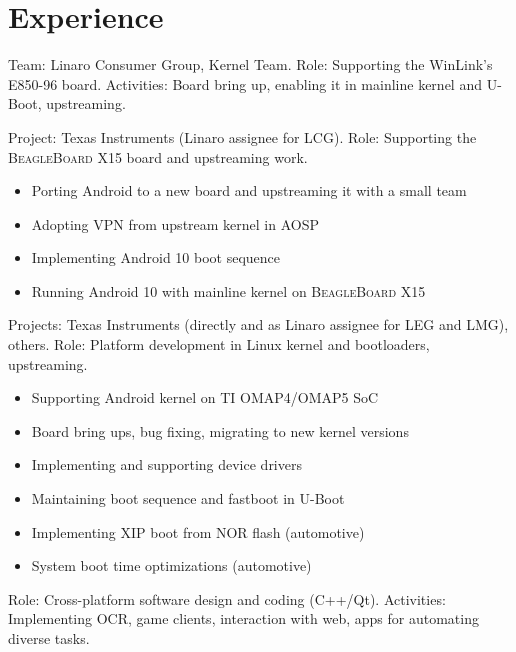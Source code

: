 \documentclass[11pt,letterpaper,sans]{moderncv}
\begin{document}
\section{Experience}
  {}
  {}
  {Team: Linaro Consumer Group, Kernel Team. \newline{}
   Role: Supporting the WinLink’s \textsc{E850-96} board. \newline{}
   Activities: Board bring up, enabling it in mainline kernel and U-Boot,
   upstreaming.}
  {Project: Texas Instruments (Linaro assignee for LCG). \newline{}
   Role: Supporting the \textsc{BeagleBoard X15} board and upstreaming work.
   \begin{itemize}
     \item Porting Android to a new board and upstreaming it with a small team
     \item Adopting VPN from upstream kernel in AOSP
     \item Implementing Android 10 boot sequence
     \item Running Android 10 with mainline kernel on \textsc{BeagleBoard X15}
   \end{itemize}}
  {Projects: Texas Instruments (directly and as Linaro assignee for LEG and
   LMG), others. \newline{}
   Role: Platform development in Linux kernel and bootloaders, upstreaming.
   \begin{itemize}
     \item Supporting Android kernel on TI OMAP4/OMAP5 SoC
     \item Board bring ups, bug fixing, migrating to new kernel versions
     \item Implementing and supporting device drivers
     \item Maintaining boot sequence and fastboot in U-Boot
     \item Implementing XIP boot from NOR flash (automotive)
     \item System boot time optimizations (automotive)
   \end{itemize}
  }
  {Role: Cross-platform software design and coding (C++/Qt). \newline{}
   Activities: Implementing OCR, game clients, interaction with web, apps for
   automating diverse tasks.}
\end{document}
